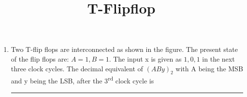 \documentclass{article}
\begin{document}
\title{T-Flipflop}
\begin{enumerate}
	\item Two T-flip flops are interconnected as shown in the figure. The present state of the flip flops are: $A = 1, B = 1$. The input x is given as $1, 0, 1$ in the next three clock cycles. The decimal equivalent of $(ABy)_{2}$ with A being the MSB and y being the LSB, after the 3\textsuperscript{rd} clock cycle is \rule{12mm}{0.4pt}

		\vspace{1cm}
	
\end{enumerate}
\end{document}
